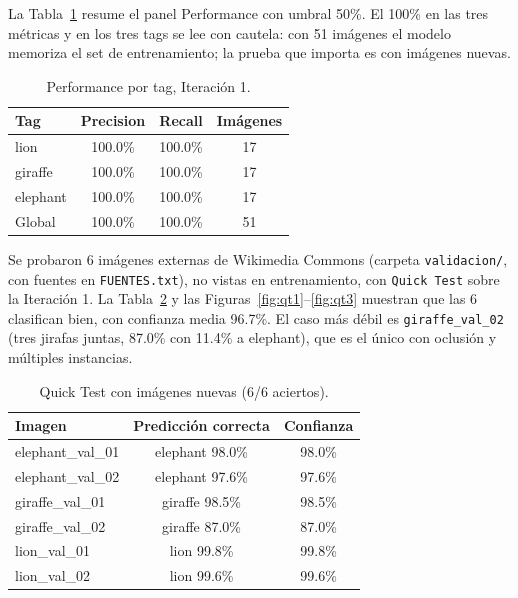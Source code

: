 \documentclass[10pt,journal]{IEEEtran}
\begin{document}
  La Tabla~\ref{tab:performance} resume el panel Performance con umbral 50\%. El 100\% en las tres m\'etricas y en los tres tags se lee con cautela: con 51 im\'agenes el modelo memoriza el set de entrenamiento; la prueba que importa es con im\'agenes nuevas.

  \begin{table}[H]
    \centering
    \caption{Performance por tag, Iteraci\'on 1.}
    \label{tab:performance}
    \begin{tabular}{lccc}
      \toprule
      Tag & Precision & Recall & Im\'agenes \\
      \midrule
      lion & 100.0\% & 100.0\% & 17 \\
      giraffe & 100.0\% & 100.0\% & 17 \\
      elephant & 100.0\% & 100.0\% & 17 \\
      \midrule
      Global & 100.0\% & 100.0\% & 51 \\
      \bottomrule
    \end{tabular}
  \end{table}

  Se probaron 6 im\'agenes externas de Wikimedia Commons (carpeta \texttt{validacion/}, con fuentes en \texttt{FUENTES.txt}), no vistas en entrenamiento, con \texttt{Quick Test} sobre la Iteraci\'on 1. La Tabla~\ref{tab:quicktest} y las Figuras~\ref{fig:qt1}--\ref{fig:qt3} muestran que las 6 clasifican bien, con confianza media 96.7\%. El caso m\'as d\'ebil es \texttt{giraffe\_val\_02} (tres jirafas juntas, 87.0\% con 11.4\% a elephant), que es el \'unico con oclusi\'on y m\'ultiples instancias.

  \begin{table}[H]
    \centering
    \caption{Quick Test con im\'agenes nuevas (6/6 aciertos).}
    \label{tab:quicktest}
    \begin{tabular}{lcc}
      \toprule
      Imagen & Predicci\'on correcta & Confianza \\
      \midrule
      elephant\_val\_01 & elephant 98.0\% & 98.0\% \\
      elephant\_val\_02 & elephant 97.6\% & 97.6\% \\
      giraffe\_val\_01 & giraffe 98.5\% & 98.5\% \\
      giraffe\_val\_02 & giraffe 87.0\% & 87.0\% \\
      lion\_val\_01 & lion 99.8\% & 99.8\% \\
      lion\_val\_02 & lion 99.6\% & 99.6\% \\
      \bottomrule
    \end{tabular}
  \end{table}
\end{document}
